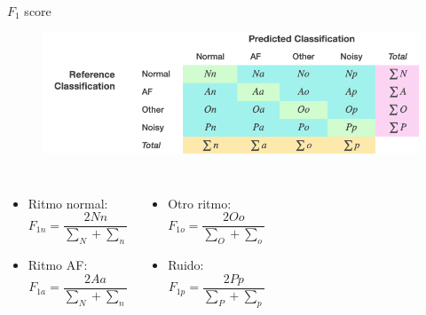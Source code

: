 \begin{frame}{$F_1$ score}
    \begin{overprint}

        
            \begin{figure}[H]
                \centering
                \includegraphics[width=\textwidth]{Images/metrica_2.png}
            \end{figure}
            
            \begin{columns}
                \centering
                \begin{itemize}
                    \item Ritmo normal:
                    \begin{equation*}
                        F_{1n} = \frac{2 Nn}{\sum_{N} + \sum_{n}}
                    \end{equation*}
                    \item Ritmo AF:
                    \begin{equation*}
                        F_{1a} = \frac{2 Aa}{\sum_{N} + \sum_{n}}
                    \end{equation*}
                 \end{itemize}
                
                \centering
                \begin{itemize}
                    \item Otro ritmo:
                    \begin{equation*}
                        F_{1o} = \frac{2 Oo}{\sum_{O} + \sum_{o}}
                    \end{equation*}
                    \item Ruido:
                    \begin{equation*}
                        F_{1p} = \frac{2 Pp}{\sum_{P} + \sum_{p}}
                    \end{equation*}
        

\end{itemize}
\end{columns}
\end{overprint}
\end{frame}
